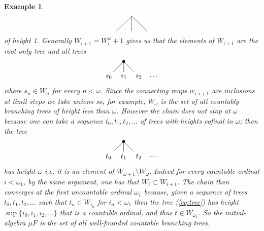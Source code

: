 \documentclass[letterpaper, 11pt, oneside]{memoir}
\theoremstyle{myteo}
\newtheorem{example}[theorem]{Example}
\numberwithin{equation}{section}
\begin{document}
\begin{example}
\begin{equation*}
\begin{tikzpicture}
      \draw (0.75 ,0.75) -- (0, 0);
      \draw (0.75 ,0.75) -- (0.75, 0);
      \draw (0.75 ,0.75) -- (1.5, 0);
    \end{tikzpicture}
  \end{equation*}
  of height 1.
  Generally \(W_{i + 1} = W_i^\omega + 1\) gives us that the elements of \(W_{i+1}\) are the root-only tree and all trees
  \begin{equation*}
    \begin{tikzpicture}
      \fill (0.75, 0.75) circle (2pt);
      \node (1) at (0, 0){\(s_0\)};
      \node (2) at (0.75, 0){\(s_1\)};
      \node (3) at (1.5 ,0){\(s_2\)};
      \node (dots) at (2.25, 0){\(\ldots\)};
      
      \draw (0.75 ,0.75) -- (1);
      \draw (0.75 ,0.75) -- (2);
      \draw (0.75 ,0.75) -- (3);
    \end{tikzpicture}
  \end{equation*}
  where \(s_n \in W_n\) for every \(n < \omega\).
  Since the connecting maps \(w_{i, i+1}\) are inclusions at limit steps we take unions so, for example, \(W_\omega\) is the set of all countably branching trees of height less than \(\omega\).
  However the chain does not stop at \(\omega\) because one can take a sequence \(t_0, t_1, t_2, \ldots\) of trees with heights cofinal in \(\omega\); then the tree
  \begin{equation}
    \label{eq:tree}
    \begin{tikzpicture}
      \fill (0.75, 0.75) circle (2pt);
      \node (1) at (0, 0){\(t_0\)};
      \node (2) at (0.75, 0){\(t_1\)};
      \node (3) at (1.5 ,0){\(t_2\)};
      \node (dots) at (2.25, 0){\(\ldots\)};
      
      \draw (0.75 ,0.75) -- (1);
      \draw (0.75 ,0.75) -- (2);
      \draw (0.75 ,0.75) -- (3);
    \end{tikzpicture}
  \end{equation}
  has height \(\omega\) i.e. it is an element of \(W_{\omega+1} \setminus W_\omega\).
  Indeed for every countable ordinal \(i < \omega_1\), by the same argument, one has that \(W_{i} \subset W_{i+1}\).
  The chain then converges at the first uncountable ordinal \(\omega_1\) because, given a sequence of trees \(t_0, t_1, t_2, \ldots\) such that \(t_n \in W_{i_n}\) for \(i_n < \omega_1\) then the tree (\ref{eq:tree}) has height \(\sup\{i_0, i_1, i_2, \ldots\}\) that is a countable ordinal, and thus \(t \in W_{\omega_1}\).
  So the initial-algebra \(\mu F\) is the set of all well-founded countable branching trees.
\end{example}

\printbibliography
\end{document}
